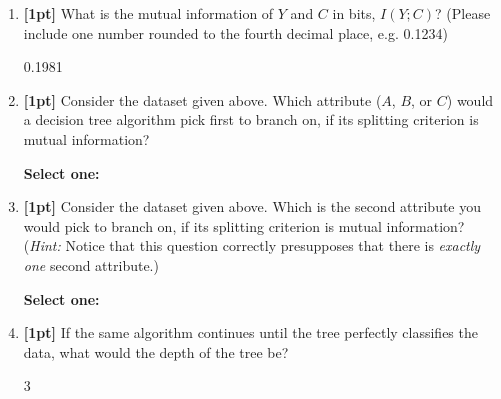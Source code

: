 \documentclass[11pt]{article}
\newcommand{\blackcircle}{\tikz\draw[black,fill=black] (0,0) circle (1ex);}
\renewcommand{\circle}{\tikz\draw[black] (0,0) circle (1ex);}
\numberwithin{equation}{section} %
\numberwithin{figure}{section} %
\numberwithin{table}{section} %
\begin{document}
\begin{enumerate}
    
    \item \textbf{[1pt]} What is the mutual information of $Y$ and $C$ in bits, $I(Y; C)$?
    (Please include one number rounded to the fourth decimal place, e.g. 0.1234)
    
    \begin{tcolorbox}[fit,height=1cm, width=2cm, blank, borderline={1pt}{-2pt},nobeforeafter]
    \begin{center}\huge0.1981\end{center}
    \end{tcolorbox}
    
    
    \item \textbf{[1pt]} Consider the dataset given above. Which attribute ($A$, $B$, or $C$) would a decision tree algorithm pick first to branch on, if its splitting criterion is mutual information?
    
    \textbf{Select one:}
    
    
    \item \textbf{[1pt]} Consider the dataset given above. Which is the second attribute you would pick to branch on, if its splitting criterion is mutual information? (\emph{Hint:} Notice that this question correctly presupposes that there is \emph{exactly one} second attribute.)
    
    \textbf{Select one:}
    
    
    \item \textbf{[1pt]} If the same algorithm continues until the tree perfectly classifies the data, what would the depth of the tree be?
    
    \begin{tcolorbox}[fit,height=1cm, width=2cm, blank, borderline={1pt}{-2pt},nobeforeafter]
    \begin{center}\Huge3\end{center}
    \end{tcolorbox}
    

\end{enumerate}
\end{document}
